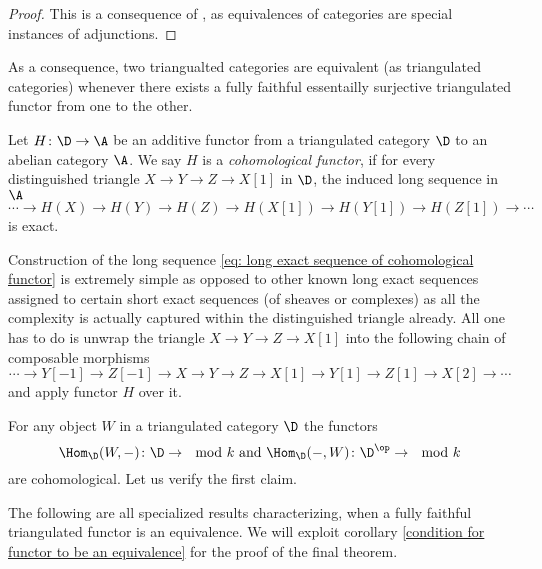 \begin{proof}
    This is a consequence of \cite[Proposition 1.41]{huybrechts2006fouriermukai}, as equivalences of categories are special instances of adjunctions. 
\end{proof}

As a consequence, two triangualted categories are equivalent (as triangulated categories) whenever there exists a fully faithful essentailly surjective triangulated functor from one to the other. 

\begin{definition}
    Let $H\colon \D \to \A$ be an additive functor from a triangulated category $\D$ to an abelian category $\A$. We say $H$ is a \emph{cohomological functor}, if for every distinguished triangle $X \to Y \to Z \to X[1]$ in $\D$, the induced long sequence in $\A$
    \begin{equation}
        \label{eq: long exact sequence of cohomological functor}
        \cdots \to H(X) \to H(Y) \to H(Z) \to H(X[1]) \to H(Y[1]) \to H(Z[1]) \to \cdots
    \end{equation}
    is exact.
\end{definition}

Construction of the long sequence \eqref{eq: long exact sequence of cohomological functor} is extremely simple as opposed to other known long exact sequences assigned to certain short exact sequences (\eg of sheaves or complexes) as all the complexity is actually captured within the distinguished triangle already. All one has to do is unwrap the triangle $X \to Y \to Z \to X[1]$ into the following chain of composable morphisms
\[
    \cdots \to Y[-1] \to Z[-1] \to X \to Y \to Z \to X[1] \to Y[1] \to Z[1] \to X[2] \to \cdots
\]
and apply functor $H$ over it. 

\begin{example}
    \label{partial homs are cohomological functors}
    For any object $W$ in a triangulated category $\D$ the functors 
    \[
    \Hom_\D(W, -) \colon \D \to \mod{k} \text{ and } \Hom_\D( - , W) \colon \D^\op \to \mod{k}
    \]
    are cohomological. Let us verify the first claim.
\end{example}

The following are all specialized results characterizing, when a fully faithful triangulated functor is an equivalence. We will exploit corollary \ref{condition for functor to be an equivalence} for the proof of the final theorem.

